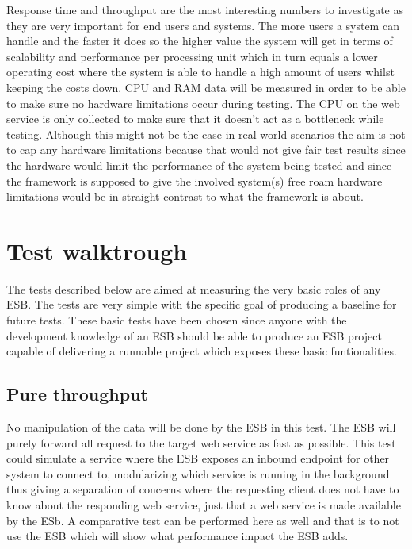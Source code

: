 Response time and throughput are the most interesting numbers to investigate as they are very important for end users and systems. The more users a system can handle and the faster it does so the higher value the system will get in terms of scalability and performance per processing unit which in turn equals a lower operating cost where the system is able to handle a high amount of users whilst keeping the costs down.
CPU and RAM data will be measured in order to be able to make sure no hardware limitations occur during testing. The CPU on the web service is only collected to make sure that it doesn't act as a bottleneck while testing. Although this might not be the case in real world scenarios the aim is not to cap any hardware limitations because that would not give fair test results since the hardware would limit the performance of the system being tested and since the framework is supposed to give the involved system(s) free roam hardware limitations would be in straight contrast to what the framework is about.

\section{Test walktrough}
The tests described below are aimed at measuring the very basic roles of any ESB. 
The tests are very simple with the specific goal of producing a baseline for future tests. 
These basic tests have been chosen since anyone with the development knowledge of an ESB should be able to produce an ESB project capable of delivering a runnable project which exposes these basic funtionalities.

\subsection{Pure throughput}
No manipulation of the data will be done by the ESB in this test. The ESB will purely forward all request to the target web service as fast as possible. 
This test could simulate a service where the ESB exposes an inbound endpoint for other system to connect to, modularizing which service is running in the background thus giving a separation of concerns where the requesting client does not have to know about the responding web service, just that a web service is made available by the ESb.
A comparative test can be performed here as well and that is to not use the ESB which will show what performance impact the ESB adds. 

